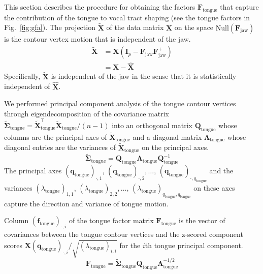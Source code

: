 \documentclass[preprint]{JASAnew}\usepackage[]{graphicx}\usepackage[]{color}
\begin{document}
This section describes the procedure for obtaining the factors $\mathbf{F}_\text{tongue}$ that capture the contribution of the tongue to vocal tract shaping  (see the tongue factors in Fig.~\ref{fig:gfa}). 
% 
The projection $\mathbf{\tilde{X}}$ of the data matrix $\mathbf{X}$ on the space $\mathrm{Null}(\mathbf{F}_\text{jaw})$ is the contour vertex motion that is independent of the jaw.
%
\begin{align} \label{eq:XXX}
\mathbf{\tilde{X}} 
&= \mathbf{X} \left( \mathbf{I}_p - \mathbf{F}_\text{jaw}\mathbf{F}_\text{jaw}^+ \right) \\
&= \mathbf{X} - \mathbf{\hat{X}} 
\end{align}
%
Specifically, $\mathbf{\tilde{X}}$ is independent of the jaw in the sense that it is statistically independent of $\mathbf{\hat{X}}$. 
%





We performed principal component analysis of the tongue contour vertices through eigendecomposition of the covariance matrix $\boldsymbol{\tilde{\Sigma}}_\text{tongue} = \mathbf{\tilde{X}}_\text{tongue}^\intercal \mathbf{\tilde{X}}_\text{tongue}/(n-1)$ into an orthogonal matrix $\mathbf{Q}_\text{tongue}$ whose columns are the principal axes of $\mathbf{\tilde{X}}_\text{tongue}$ and a diagonal matrix $\boldsymbol{\Lambda}_\text{tongue}$ whose diagonal entries are the variances of $\mathbf{\tilde{X}}_\text{tongue}$ on the principal axes.
% 
\begin{equation}
\boldsymbol{\tilde{\Sigma}}_\text{tongue} = \mathbf{Q}_\text{tongue} \boldsymbol{\Lambda}_\text{tongue} \mathbf{Q}_\text{tongue}^{-1}
\end{equation}
%
The principal axes $(\mathbf{q}_\text{tongue})_{\cdot,1}$, $(\mathbf{q}_\text{tongue})_{\cdot,2}, \ldots$, $(\mathbf{q}_\text{tongue})_{\cdot,q_\text{tongue}}$ and the variances $(\lambda_\text{tongue})_{1,1}$, $(\lambda_\text{tongue})_{2,2}, \ldots$, $(\lambda_\text{tongue})_{q_\text{tongue},q_\text{tongue}}$ on these axes capture the direction and variance of tongue motion.


Column $(\mathbf{f}_\text{tongue})_{\cdot,i}$ of the tongue factor matrix $\mathbf{F}_\text{tongue}$ is the vector of covariances between the tongue contour vertices and the z-scored component scores $\mathbf{X} (\mathbf{q}_\text{tongue})_{\cdot,i} / \sqrt{(\lambda_\text{tongue})_{i,i}}$ for the $i$th tongue principal component. 
%
\begin{equation}
\mathbf{F}_\text{tongue}
 = \boldsymbol{\tilde{\Sigma}}_\text{tongue} \mathbf{Q}_\text{tongue} \boldsymbol{\Lambda}_\text{tongue}^{-1/2}
\end{equation}
\end{document}
